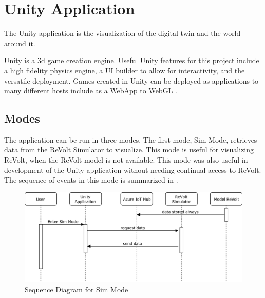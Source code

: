 \chapter{Unity Application}
The Unity application is the visualization of the digital twin and the world around it. 

Unity is a 3d game creation engine. Useful Unity features for this project include a high fidelity physics engine, a UI builder to allow for interactivity, and the versatile deployment. Games created in Unity can be deployed as applications to many different hosts include as a WebApp to WebGL \cite{unityOverview}.



\section{Modes}
The application can be run in three modes. The first mode, Sim Mode, retrieves data from the ReVolt Simulator to visualize. This mode is useful for visualizing ReVolt, when the ReVolt model is not available. This mode was also useful in development of the Unity application without needing continual access to ReVolt. The sequence of events in this mode is summarized in .

\begin{figure}[H]
\centering
\includegraphics[scale=0.5]{Images/Sequence_Diagram_sim.pdf}
\caption{Sequence Diagram for Sim Mode}
\label{fig:sequenceSimMode}
\end{figure}

